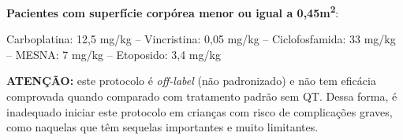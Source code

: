 \documentclass[11pt,a4paper,oldfontcommands]{memoir}
\begin{document}
\textbf{Pacientes com superfície corpórea menor ou igual a 0,45m\textsuperscript{2}}:

Carboplatina: 12,5 mg/kg – Vincristina: 0,05 mg/kg – Ciclofosfamida: 33 mg/kg – MESNA: 7 mg/kg – Etoposido: 3,4 mg/kg

\textbf{ATENÇÃO:} este protocolo é \textit{off-label} (não padronizado) e não tem eficácia comprovada quando comparado com tratamento padrão sem QT. Dessa forma, é inadequado iniciar este protocolo em crianças com risco de complicações graves, como naquelas que têm sequelas importantes e muito limitantes.\\
\end{document}
